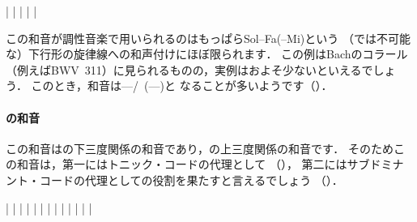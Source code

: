 \documentclass[dvipdfmx,uplatex,b5paper,openany,jbase=12Q,nomag*,textwidth-limit=44%
               ]{gachimuchi}
\begin{document}
\begin{floatMusic}[pos=ht]
  \Startpiece%
  \NOTes
  |%
  \en\bar
  \NOTes
  |%
  \en\bar
  \NOTes
  |%
  \en\setdoublebar
  \endpiece%
\end{floatMusic}

この和音が調性音楽で用いられるのはもっぱらSol\aNatural--Fa\aNatural(--Mi)という
（\Gnv では不可能な）下行形の旋律線への和声付けにほぼ限られます．
この例はBachのコラール（例えばBWV~311）に見られるものの，実例はおよそ少ないといえるでしょう．
このとき，和音は\Gnv\Min---\Gniv\Min/\bFlat\Gnvi\ (---)と
なることが多いようです（）．

\paragraph{\bFlat\Gnvi の和音}
この和音は\Gni\Min の下三度関係の和音であり，\Gniv\Min の上三度関係の和音です．
そのためこの和音は，第一にはトニック・コードの代理として
（），
第二にはサブドミナント・コードの代理としての役割を果たすと言えるでしょう
（）．

\begin{floatMusic}[pos=ht]
  \Startpiece%
  \znotes|\en
  \znotes|\en
  \NOTes
  |%
  \en\bar
  \NOTEs
  |%
  \en\doublebar
  \znotes|\en
  \NOTes
  |%
  \en\bar
  \NOTEs
  |%
  \en\doublebar
  \znotes|\en
  \NOTEs
  |%
  \en\bar
  \NOTEs
  |%
  \en\setdoublebar
  \endpiece%
\end{floatMusic}
\end{document}
